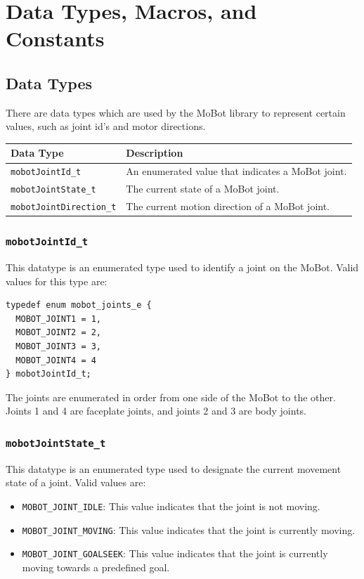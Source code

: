 \documentclass[11pt]{report}
\begin{document}
\chapter{Data Types, Macros, and Constants}
\section{Data Types}
There are data types which are used by the MoBot library to represent 
certain values, such as joint id's and motor directions.

\begin{tabular}{p{3.5cm}p{7cm}} \hline 
Data Type& Description \\
\hline 
\texttt{mobotJointId\_t} & An enumerated value that indicates a MoBot joint. \\
\texttt{mobotJointState\_t} & The current state of a MoBot joint. \\
\texttt{mobotJointDirection\_t} & The current motion direction of a MoBot joint. 
\end{tabular}

\subsection{\label{sec:mobotJointId_t}\texttt{mobotJointId\_t}}
This datatype is an enumerated type used to identify a joint on the MoBot. Valid
values for this type are:
\begin{verbatim}
typedef enum mobot_joints_e {
  MOBOT_JOINT1 = 1,
  MOBOT_JOINT2 = 2,
  MOBOT_JOINT3 = 3,
  MOBOT_JOINT4 = 4
} mobotJointId_t;
\end{verbatim}
The joints are enumerated in order from one side of the MoBot to the other. Joints 1 and 4
are faceplate joints, and joints 2 and 3 are body joints.

\subsection{\label{sec:mobotJointState_t}\texttt{mobotJointState\_t}}
This datatype is an enumerated type used to designate the current 
movement state of a joint. Valid values are:
\begin{itemize}
\item \texttt{MOBOT\_JOINT\_IDLE}: This value indicates that the joint is not moving.
\item \texttt{MOBOT\_JOINT\_MOVING}: This value indicates that the joint is currently moving.
\item \texttt{MOBOT\_JOINT\_GOALSEEK}: This value indicates that the joint is currently moving
  towards a predefined goal.
\end{itemize}
\end{document}

